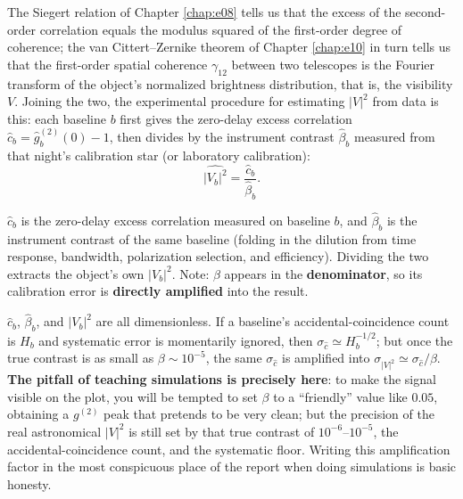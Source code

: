The Siegert relation of Chapter \ref{chap:e08} tells us that the excess of the second-order correlation equals the modulus squared of the first-order degree of coherence; the van Cittert--Zernike theorem of Chapter \ref{chap:e10} in turn tells us that the first-order spatial coherence \(\gamma_{12}\) between two telescopes is the Fourier transform of the object's normalized brightness distribution, that is, the visibility \(V\). Joining the two, the experimental procedure for estimating \(|V|^2\) from data is this: each baseline \(b\) first gives the zero-delay excess correlation \(\hat c_b=\hat g^{(2)}_b(0)-1\), then divides by the instrument contrast \(\hat\beta_b\) measured from that night's calibration star (or laboratory calibration):
\begin{equation}
  \widehat{|V_b|^2}=\frac{\hat c_b}{\hat\beta_b}.
  \label{eq:e26-v2-estimator}
\end{equation}
\begin{formulaexplain}
\(\hat c_b\) is the zero-delay excess correlation measured on baseline \(b\), and \(\hat\beta_b\) is the instrument contrast of the same baseline (folding in the dilution from time response, bandwidth, polarization selection, and efficiency). Dividing the two extracts the object's own \(|V_b|^2\). Note: \(\beta\) appears in the \textbf{denominator}, so its calibration error is \textbf{directly amplified} into the result.
\end{formulaexplain}
\(\hat c_b\), \(\hat\beta_b\), and \(|V_b|^2\) are all dimensionless. If a baseline's accidental-coincidence count is \(H_b\) and systematic error is momentarily ignored, then \(\sigma_{\hat c}\simeq H_b^{-1/2}\); but once the true contrast is as small as \(\beta\sim10^{-5}\), the same \(\sigma_{\hat c}\) is amplified into \(\sigma_{|V|^2}\simeq\sigma_{\hat c}/\beta\). \textbf{The pitfall of teaching simulations is precisely here}: to make the signal visible on the plot, you will be tempted to set \(\beta\) to a ``friendly'' value like \(0.05\), obtaining a \(g^{(2)}\) peak that pretends to be very clean; but the precision of the real astronomical \(|V|^2\) is still set by that true contrast of \(10^{-6}\)--\(10^{-5}\), the accidental-coincidence count, and the systematic floor. Writing this amplification factor in the most conspicuous place of the report when doing simulations is basic honesty.

